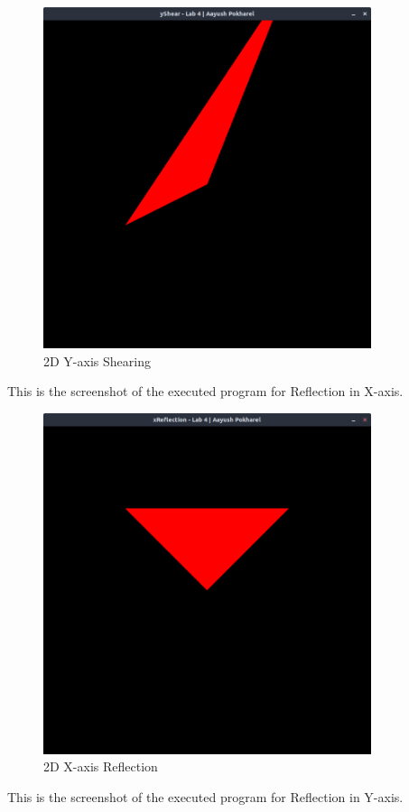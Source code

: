 \documentclass[12pt]{article}
\begin{document}
\begin{figure}[h]
    \centerline{\includegraphics[height=100mm]{2dyShear.png}}
    \caption{2D Y-axis Shearing}
    \label{fig}
\end{figure}
\clearpage
This is the screenshot of the executed program for Reflection in X-axis.
\begin{figure}[h]
    \centerline{\includegraphics[height=100mm]{2dxReflection.png}}
    \caption{2D X-axis Reflection}
    \label{fig}
\end{figure}
\clearpage
This is the screenshot of the executed program for Reflection in Y-axis.
\end{document}
